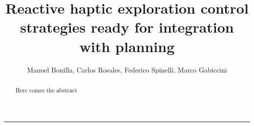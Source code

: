 \documentclass[a4paper,11pt,pdf]{pacmanreport}
\title{Reactive haptic exploration control strategies ready for integration with planning}
\author{Manuel Bonilla, Carlos Rosales, Federico Spinelli, Marco Gabiccini}
\begin{document}
\maketitle

\begin{abstract}
\noindent Here comes the abstract
\end{abstract}


\vspace{.2em}
\hrule

\vspace{.2em}
\footnotesize

\tableofcontents

\normalsize

\newpage






















\end{document}
